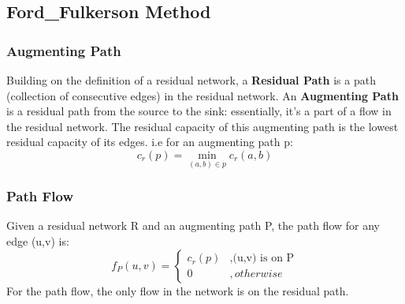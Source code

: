 \subsection{Ford\_Fulkerson Method}

\subsubsection{Augmenting Path}
Building on the definition of a residual network, a \textbf{Residual Path} is a path (collection of consecutive edges) in the residual network. An \textbf{Augmenting Path} is a residual path from the source to the sink: essentially, it's a part of a flow in the residual network. The residual capacity of this augmenting path is the lowest residual capacity of its edges. i.e for an augmenting path p:
\begin{equation}
    c_r(p) = \min_{(a,b)\in p} c_r(a,b)
\end{equation}

\subsubsection{Path Flow}
Given a residual network R and an augmenting path P, the path flow for any edge (u,v) is:
\begin{equation}
    f_P(u,v) = 
    \begin{cases}
        c_r(p) &, \text{(u,v) is on P} \\
        0 &, otherwise
    \end{cases}
\end{equation}
For the path flow, the only flow in the network is on the residual path.

